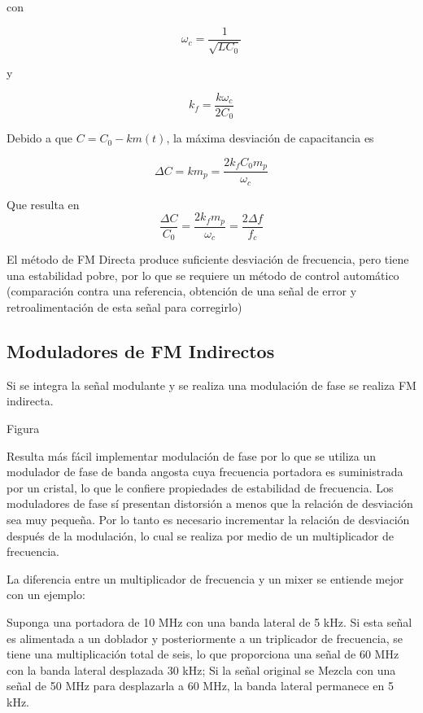 \documentclass[12pt,letterpaper,titlepage,twoside]{book}
\begin{document}
con 

\begin{equation}
\omega_c = \frac{1}{\sqrt{LC_0}}
\end{equation}

y 


 \begin{equation}
 k_f = \frac{k \omega_c }{2 C_0} 
 \end{equation}
 
 Debido a que  $C = C_0 -k m(t)$, la máxima desviación de capacitancia es
 
 \begin{equation}
  \Delta C = k m_p = \frac{2 k_f C_0 m_p}{\omega_c}
  \end{equation} 
  
  Que resulta en 
  \begin{equation}
  \frac{\Delta C }{C_0}=\frac{2 k_f m_p}{\omega_c} = \frac{2 \Delta f}{f_c} 
  \end{equation}
  
  El método de FM Directa produce suficiente desviación de frecuencia, pero tiene una estabilidad pobre, por lo que se requiere un método de control automático (comparación contra una referencia, obtención de una señal de error y retroalimentación de esta señal para corregirlo)
  
  \subsection{Moduladores de FM Indirectos}
  
  Si se integra la señal modulante y se realiza una modulación de fase se realiza FM indirecta.
  
  Figura
  
  Resulta más fácil implementar modulación de fase por lo que se utiliza un modulador de fase de banda angosta cuya frecuencia portadora es suministrada por un cristal, lo que le confiere propiedades de estabilidad de frecuencia. Los moduladores de fase sí presentan distorsión a menos que la relación de desviación sea muy pequeña. Por lo tanto es necesario incrementar la relación de desviación después de la modulación, lo cual se realiza por medio de un multiplicador de frecuencia.
  
  La diferencia entre un multiplicador de frecuencia y un mixer se entiende mejor con un ejemplo:
  
 Suponga una portadora de 10 MHz con una banda lateral de 5 kHz. Si esta señal es alimentada a un doblador y posteriormente a un triplicador de frecuencia, se tiene una multiplicación total de seis, lo que proporciona una señal de 60 MHz con la banda lateral desplazada 30 kHz; Si la señal original se Mezcla con una señal de 50 MHz para desplazarla a 60 MHz, la banda lateral permanece en 5 kHz.
 
\end{document}
